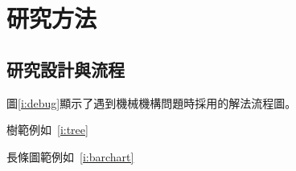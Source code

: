 \chapter{研究方法}
\label{c:methoc}
\section{研究設計與流程}

圖\ref{i:debug}顯示了遇到機械機構問題時採用的解法流程圖。


樹範例如~\ref{i:tree}

\clearpage

長條圖範例如~\ref{i:barchart}

